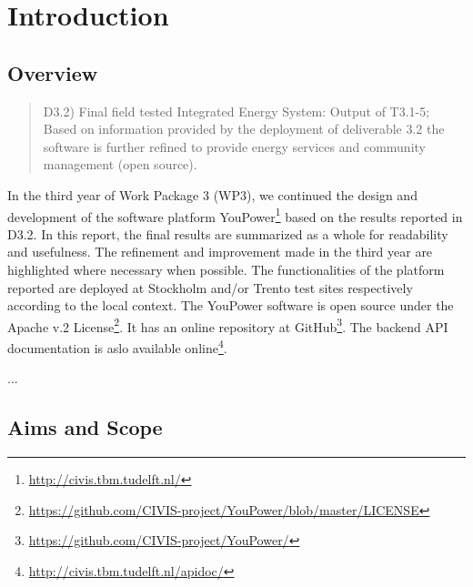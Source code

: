 
\section{Introduction}

\subsection{Overview}

\begin{quote}
D3.2) Final field tested Integrated Energy System: Output of T3.1-5; Based on information provided by the deployment of deliverable 3.2 the software is further refined to provide energy services and community management (open source). 
\end{quote}

In the third year of Work Package 3 (WP3), we continued the design and development of the software platform YouPower\footnote{ \url{http://civis.tbm.tudelft.nl/}} based on the results reported in D3.2. In this report, the final results are summarized as a whole for readability and usefulness. The refinement and improvement made in the third year are highlighted where necessary when possible. 
% 
The functionalities of the platform reported are deployed at Stockholm and/or Trento test sites respectively according to the local context. The YouPower software is open source under the Apache v.2 License\footnote{\url{https://github.com/CIVIS-project/YouPower/blob/master/LICENSE}}. It has  an online repository at GitHub\footnote{ \url{https://github.com/CIVIS-project/YouPower/}}. 
The backend API documentation is aslo available online\footnote{ \url{http://civis.tbm.tudelft.nl/apidoc/}}. 

...

\subsection{Aims and Scope}

